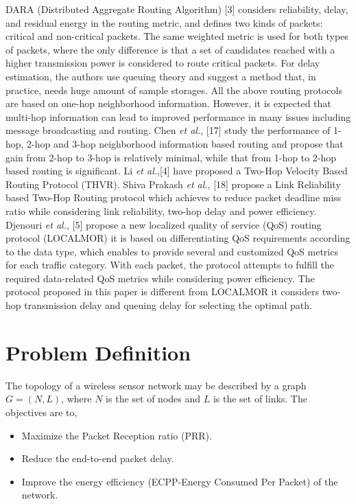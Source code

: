\documentclass[fleqn,twoside]{article}
\begin{document}
\vskip 2mm
DARA (Distributed Aggregate Routing Algorithm) [3] considers reliability, delay, and residual energy 
in the routing metric, and defines two kinds of packets: critical and non-critical packets. The same weighted metric is used for both types of packets, where the only difference is that a set of candidates reached with a higher transmission power is considered to route critical packets. For delay estimation, the authors use queuing theory and suggest a method that, in practice, needs huge amount of sample
storages.
\vskip 2mm
All the above routing protocols are based on one-hop neighborhood information. However, it is expected that multi-hop information can lead to improved performance in many issues including message broadcasting and routing. Chen \emph{et al.}, [17] study the performance of 1-hop, 2-hop and 3-hop neighborhood information based
routing and propose that gain from 2-hop to 3-hop is relatively minimal, while that from 1-hop to 2-hop based routing is significant.
Li \emph{et al.},[4] have proposed a Two-Hop Velocity Based Routing Protocol (THVR). 
Shiva Prakash  \emph{et al.}, [18] propose a Link Reliability based Two-Hop Routing protocol which achieves to 
reduce packet deadline miss ratio while considering link reliability, two-hop delay and power efficiency.
\vskip 2mm
Djenouri \emph{et al.}, [5] propose a new localized quality of service (QoS) routing protocol (LOCALMOR) it is based on differentiating QoS requirements
according to the data type, which enables to provide several and customized QoS metrics for each traffic category. With each packet,
the protocol attempts to fulfill the required data-related QoS metrics while considering power efficiency. The protocol proposed in this paper is different from LOCALMOR it considers two-hop transmission delay and queuing delay for selecting the optimal path.
 \section{Problem Definition}
\label{section:pd}
The topology of a wireless sensor network may be described by a graph $G=(N,L)$, where $N$ is the set of nodes and $L$ is the set of links. The objectives are to,
\begin{itemize}
\item Maximize the Packet Reception ratio (PRR).
\item Reduce the end-to-end packet delay.
\item Improve the energy efficiency (ECPP-Energy Consumed Per Packet) of the network.
\end{itemize}
\end{document}
